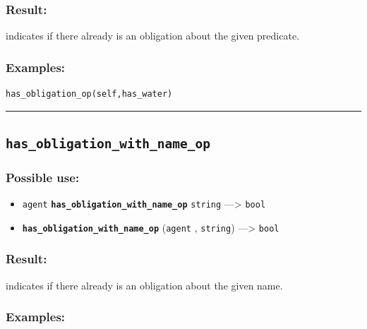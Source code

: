 \documentclass[]{book}
\providecommand{\tightlist}{%
  \setlength{\itemsep}{0pt}\setlength{\parskip}{0pt}}
\theoremstyle{definition}
\theoremstyle{definition}
\theoremstyle{definition}
\theoremstyle{remark}
\begin{document}
\subsubsection{Result:}\label{result-245}

indicates if there already is an obligation about the given predicate.

\subsubsection{Examples:}\label{examples-194}

\begin{verbatim}
has_obligation_op(self,has_water) 
\end{verbatim}

\begin{center}\rule{0.5\linewidth}{\linethickness}\end{center}

\subsection{\texorpdfstring{\texttt{has\_obligation\_with\_name\_op}}{has\_obligation\_with\_name\_op}}\label{has_obligation_with_name_op}

\subsubsection{Possible use:}\label{possible-use-255}

\begin{itemize}
\tightlist
\item
  \texttt{agent} \textbf{\texttt{has\_obligation\_with\_name\_op}}
  \texttt{string} ---\textgreater{} \texttt{bool}
\item
  \textbf{\texttt{has\_obligation\_with\_name\_op}} (\texttt{agent} ,
  \texttt{string}) ---\textgreater{} \texttt{bool}
\end{itemize}

\subsubsection{Result:}\label{result-246}

indicates if there already is an obligation about the given name.

\subsubsection{Examples:}\label{examples-195}
\end{document}
